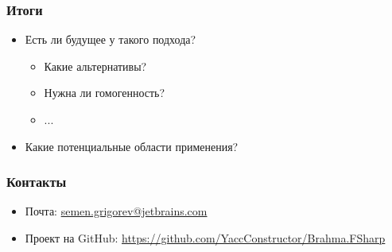 \documentclass[xcolor=table]{beamer}
\begin{document}
\begin{frame}
  \transwipe[direction=90]
  \frametitle{Итоги}
\begin{itemize} 
\item Есть ли будущее у такого подхода?
\begin{itemize} 
  \item Какие альтернативы?
  \item Нужна ли гомогенность?
  \item ...
\end{itemize}
\item Какие потенциальные области применения?

\end{itemize}

\end{frame}

            
\begin{frame}
\transwipe[direction=90]
\frametitle{Контакты}
\begin{itemize}
  \item Почта: \url{semen.grigorev@jetbrains.com}
  \item Проект на GitHub: \url{https://github.com/YaccConstructor/Brahma.FSharp}
\end{itemize}
\end{frame}
\end{document}
